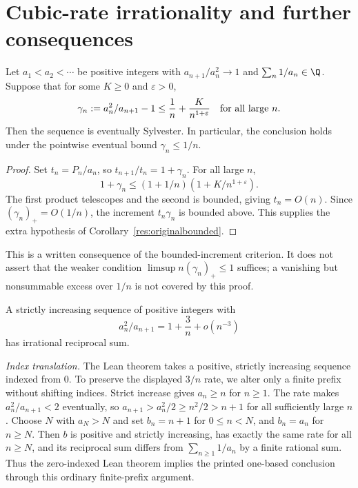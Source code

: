 \documentclass[11pt]{article}
\begin{document}
\section{Cubic-rate irrationality and further consequences}\label{sec:secondaryrate}
\begin{corollary}\label{res:inclusiveone}
Let $a_1<a_2<\cdots$ be positive integers with $a_{n+1}/a_n^2\to1$
and $\sum_n1/a_n\in\Q$. Suppose that for some $K\ge0$ and $\varepsilon>0$,
\[
 \gamma_n:=a_n^2/a_{n+1}-1\le \frac1n+\frac{K}{n^{1+\varepsilon}}
 \quad\hbox{for all large }n.
\]
Then the sequence is eventually Sylvester. In particular, the conclusion
holds under the pointwise eventual bound $\gamma_n\le1/n$.
\end{corollary}
\begin{proof}
Set $t_n=P_n/a_n$, so $t_{n+1}/t_n=1+\gamma_n$. For all large $n$,
\[
 1+\gamma_n\le(1+1/n)(1+K/n^{1+\varepsilon}).
\]
The first product telescopes and the second is bounded, giving $t_n=O(n)$.
Since $(\gamma_n)_+=O(1/n)$, the increment $t_n\gamma_n$ is bounded
above. This supplies the extra hypothesis of Corollary~\ref{res:originalbounded}.
\end{proof}
This is a written consequence of the bounded-increment criterion. It does not
assert that the weaker condition $\limsup n(\gamma_n)_+\le1$ suffices;
a vanishing but nonsummable excess over $1/n$ is not covered by this proof.

\begin{theorem}\label{res:cubicrate}
A strictly increasing sequence of positive integers with
\[
 a_n^2/a_{n+1}=1+\frac3n+o(n^{-3})
\]
has irrational reciprocal sum.
\end{theorem}

\noindent\emph{Index translation.} The Lean theorem takes a positive, strictly
increasing sequence indexed from $0$. To preserve the displayed $3/n$ rate,
we alter only a finite prefix without shifting indices. Strict increase gives
$a_n\ge n$ for $n\ge1$. The rate makes $a_n^2/a_{n+1}<2$ eventually, so
$a_{n+1}>a_n^2/2\ge n^2/2>n+1$ for all sufficiently large $n$.
Choose $N$ with $a_N>N$ and set $b_n=n+1$ for $0\le n<N$, and $b_n=a_n$
for $n\ge N$. Then $b$ is positive and strictly increasing, has exactly
the same rate for all $n\ge N$, and its reciprocal sum differs from
$\sum_{n\ge1}1/a_n$ by a finite rational sum. Thus the zero-indexed Lean
theorem implies the printed one-based conclusion through this ordinary
finite-prefix argument.
\end{document}
